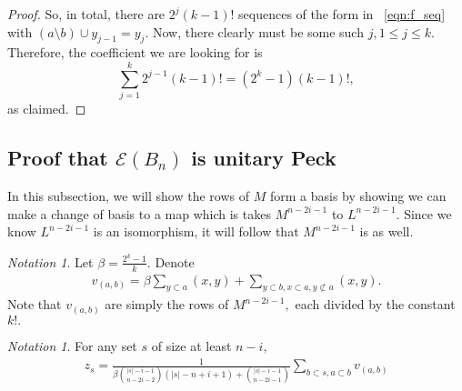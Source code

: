 \documentclass[10 pt]{amsart}
\theoremstyle{plain}
\theoremstyle{definition}
\theoremstyle{remark}
\newtheorem{note}[thm]{Notation}
\numberwithin{equation}{section}
\newcommand\ssec{\subsection}
\begin{document}
\begin{proof}
So, in total, there are $2^j(k-1)!$ sequences of the form in ~\eqref{eqn:f_seq} with $(a\setminus b) \cup y_{j-1} = y_j$. Now, there clearly must be some such $j,1 \leq j \leq k.$ Therefore, the coefficient we are looking for is 
$$\sum_{j = 1}^k 2^{j-1}(k-1)! = (2^k - 1)(k-1)!,$$
as claimed.

\end{proof}



\ssec{Proof that $\mathcal E(B_n)$ is unitary Peck}

In this subsection, we will show the rows of $M$ form a basis by showing we can make a change of basis to a map which is takes $M^{n-2i-1}$ to $L^{n-2i-1}.$ Since we know $L^{n-2i-1}$ is an isomorphism, it will follow that $M^{n-2i-1}$ is as well.

\begin{note}

Let $\beta = \frac{2^k-1}{k}.$ Denote 
\begin{align*}
	v_{(a, b)} =\beta \sum_{y \subset a}^{}(x, y) + \sum_{y\subset b,x \subset a,y\not\subset a}^{}(x, y).
\end{align*}
Note that $v_{(a, b)}$ are simply the rows of $M^{n-2i-1},$ each divided by the constant $k!.$
\end{note}

\begin{note}
For any set $s$ of size at least $n-i,$
\begin{align*}
	z_s = \frac{1}{\beta\binom {|s|-i-1}{n-2i-2}(|s|-n+i+1)+\binom{|s|-i-1}{n-2i-1}} \sum_{b\subset s,a \subset b}^{}v_{(a, b)}
\end{align*}
\end{note}
\end{document}
